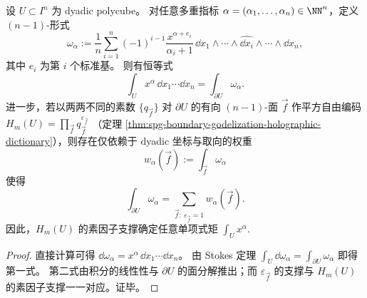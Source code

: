 \begin{theorem}\label{thm:spg-boundary-godel-moment-readout}
设 \(U\subset I^n\) 为 dyadic polycube。
对任意多重指标 \(\alpha=(\alpha_1,\dots,\alpha_n)\in\NN^n\)，定义 \((n-1)\)-形式
\[
\omega_\alpha
:=\frac1n\sum_{i=1}^n (-1)^{i-1}\frac{x^{\alpha+e_i}}{\alpha_i+1}\,
\dd x_1\wedge\cdots\wedge\widehat{\dd x_i}\wedge\cdots\wedge \dd x_n,
\]
其中 \(e_i\) 为第 \(i\) 个标准基。
则有恒等式
\[
\int_U x^\alpha\,\dd x_1\cdots \dd x_n
=\int_{\partial U}\omega_\alpha.
\]
进一步，若以两两不同的素数 \(\{q_{\vec f}\}\) 对 \(\partial U\) 的有向 \((n-1)\)-面 \(\vec f\) 作平方自由编码
\(
H_m(U)=\prod_{\vec f} q_{\vec f}^{\varepsilon_{\vec f}}
\)
（定理 \ref{thm:spg-boundary-godelization-holographic-dictionary}），则存在仅依赖于 dyadic 坐标与取向的权重
\[
w_\alpha(\vec f):=\int_{\vec f}\omega_\alpha
\]
使得
\[
\int_{\partial U}\omega_\alpha=\sum_{\vec f:\ \varepsilon_{\vec f}=1} w_\alpha(\vec f).
\]
因此，\(H_m(U)\) 的素因子支撑确定任意单项式矩 \(\int_U x^\alpha\).
\end{theorem}
\begin{proof}
直接计算可得 \( \dd\omega_\alpha=x^\alpha\,\dd x_1\cdots \dd x_n \)。
由 Stokes 定理 \(\int_U \dd\omega_\alpha=\int_{\partial U}\omega_\alpha\) 即得第一式。
第二式由积分的线性性与 \(\partial U\) 的面分解推出；而 \(\varepsilon_{\vec f}\) 的支撑与 \(H_m(U)\) 的素因子支撑一一对应。证毕。
\end{proof}



